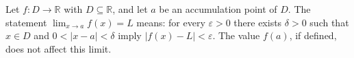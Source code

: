 
Let $f:D\to\mathbb R$ with $D\subseteq\mathbb R$, and let $a$ be an accumulation point of $D$. The statement $\lim_{x\to a}f(x)=L$ means: for every $\varepsilon>0$ there exists $\delta>0$ such that $x\in D$ and $0<|x-a|<\delta$ imply $|f(x)-L|<\varepsilon$. The value $f(a)$, if defined, does not affect this limit.
